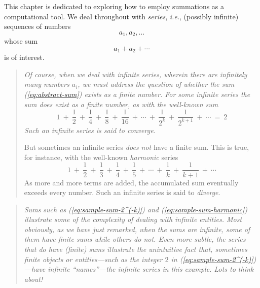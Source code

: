 This chapter is dedicated to exploring how to employ summations as a
computational tool.  We deal throughout with {\it series}, {\it i.e.},
(possibly infinite) sequences of numbers
\[ a_1, a_2, \ldots \]
whose sum
\begin{equation}
\label{eq:abstract-sum}
a_1 + a_2 + \cdots
\end{equation}
is of interest.
\begin{quote}
{\em Of course, when we deal with {\em infinite} series, wherein there
  are infinitely many numbers $a_i$, we must address the question of
  whether the sum (\ref{eq:abstract-sum}) exists as a finite number.
  For some infinite series the sum {\em does} exist as a finite
  number, as with the well-known sum
\begin{equation}
\label{eq:sample-sum-2^(-k)}
 1 \ + \ \frac{1}{2} \ + \ \frac{1}{4} \ + \ \frac{1}{8} \ +
\ \frac{1}{16} \ + \ \cdots \ + \ \frac{1}{2^k}  \ +
\ \frac{1}{2^{k+1}} \ + \ \cdots \ = \ 2 
\end{equation}
Such an infinite series is said to {\em converge}.

But sometimes an infinite series {\em does not} have a finite
  sum.  This is true, for instance, with the well-known {\it harmonic}
  series 
\begin{equation}
\label{eq:sample-sum-harmonic}
1 \ + \ \frac{1}{2} \ + \ \frac{1}{3} \ + \ \frac{1}{4} \ +
\ \frac{1}{5} \ + \ \cdots \ + \ \frac{1}{k} \ + \ \frac{1}{k+1} \ +
\ \cdots
\end{equation}
As more and more terms are added, the accumulated sum eventually
exceeds every number.  Such an infinite series is said to {\em diverge}.

}
\end{quote}

\begin{quote}
{\em Sums such as (\ref{eq:sample-sum-2^(-k)}) and
  (\ref{eq:sample-sum-harmonic}) illustrate some of the complexity of
  dealing with infinite entities.  Most obviously, as we have just
  remarked, when the sums are infinite, some of them have finite sums
  while others do not.  Even more subtle, the series that {\em do}
  have (finite) sums illustrate the unintuitive fact that, sometimes
  finite objects or entities---such as the integer $2$ in
  (\ref{eq:sample-sum-2^(-k)})---have infinite ``names''---the
  infinite series in this example.  Lots to think about!
}
\end{quote}

